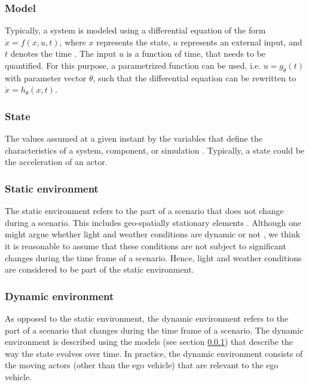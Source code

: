 \subsubsection{Model}
\label{sec:model}
Typically, a system is modeled using a differential equation of the form $\dot{x}=f(x,u,t)$, where $x$ represents the state, $u$ represents an external input, and $t$ denotes the time \cite{norman2011control}. The input $u$ is a function of time, that needs to be quantified. For this purpose, a parametrized function can be used, i.e. $u=g_{\theta}(t)$ with parameter vector $\theta$, such that the differential equation can be rewritten to $\dot{x}=h_{\theta}(x,t)$.

\subsubsection{State}
\label{sec:state}
The values assumed at a given instant by the variables that define the characteristics of a system, component, or simulation \cite{ieee1990glossary}. Typically, a state could be the acceleration of an actor.

\subsubsection{Static environment}
\label{sec:static environment}
The static environment refers to the part of a scenario that does not change during a scenario. This includes geo-spatially stationary elements \cite{ulbrich2015}. Although one might argue whether light and weather conditions are dynamic or not \cite{geyer2014,bach2016modelbased}, we think it is reasonable to assume that these conditions are not subject to significant changes during the time frame of a scenario. Hence, light and weather conditions are considered to be part of the static environment.

\subsubsection{Dynamic environment}
\label{sec:dynamic environment}
As opposed to the static environment, the dynamic environment refers to the part of a scenario that changes during the time frame of a scenario. The dynamic environment is described using the models (see section \ref{sec:model}) that describe the way the state evolves over time. In practice, the dynamic environment consists of the moving actors (other than the ego vehicle) that are relevant to the ego vehicle.

